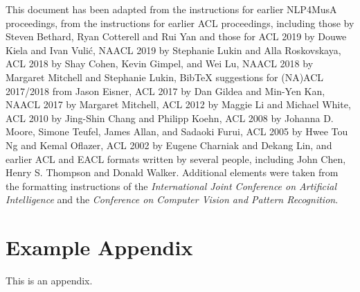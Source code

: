 \documentclass[11pt]{article}
\begin{document}
This document has been adapted from the instructions
for earlier NLP4MusA proceedings,
from the instructions for earlier ACL proceedings,
including those 
by Steven Bethard, Ryan Cotterell and Rui Yan
and those for
ACL 2019 by Douwe Kiela and Ivan Vuli\'{c},
NAACL 2019 by Stephanie Lukin and Alla Roskovskaya,
ACL 2018 by Shay Cohen, Kevin Gimpel, and Wei Lu,
NAACL 2018 by Margaret Mitchell and Stephanie Lukin,
Bib\TeX{} suggestions for (NA)ACL 2017/2018 from Jason Eisner,
ACL 2017 by Dan Gildea and Min-Yen Kan,
NAACL 2017 by Margaret Mitchell,
ACL 2012 by Maggie Li and Michael White,
ACL 2010 by Jing-Shin Chang and Philipp Koehn,
ACL 2008 by Johanna D. Moore, Simone Teufel, James Allan, and Sadaoki Furui,
ACL 2005 by Hwee Tou Ng and Kemal Oflazer,
ACL 2002 by Eugene Charniak and Dekang Lin,
and earlier ACL and EACL formats written by several people, including
John Chen, Henry S. Thompson and Donald Walker.
Additional elements were taken from the formatting instructions of the \emph{International Joint Conference on Artificial Intelligence} and the \emph{Conference on Computer Vision and Pattern Recognition}.



\appendix

\section{Example Appendix}
\label{sec:appendix}

This is an appendix.
\end{document}
